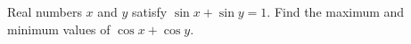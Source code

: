 Real numbers $x$ and $y$ satisfy $\sin x+\sin y=1$. Find the maximum and minimum values of $\cos x+\cos y$.
